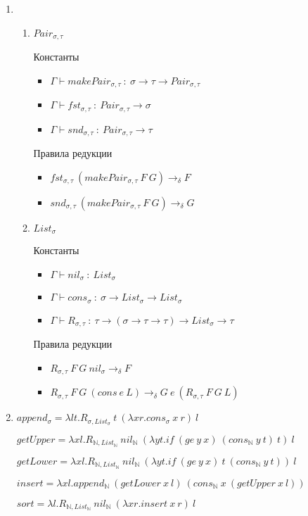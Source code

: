 \documentclass[10pt]{article}
\newcommand{\tod}{\to_\delta}
\renewcommand{\l}{\lambda}
\newcommand{\s}{\sigma}
\newcommand{\N}{\mathbb{N}}
\begin{document}
\begin{enumerate}
	\item 
	\begin{enumerate}
		\item $Pair_{\s, \tau}$
		
		Константы
		\begin{itemize}
			\item $\Gamma \vdash makePair_{\s,\tau}\ :\ \s \to \tau \to Pair_{\s, \tau}$
			\item $\Gamma \vdash fst_{\s, \tau}\ :\ Pair_{\s, \tau} \to \s$
			\item $\Gamma \vdash snd_{\s, \tau}\ :\ Pair_{\s, \tau} \to \tau$
		\end{itemize}
		
		Правила редукции
		\begin{itemize}
			\item $fst_{\s, \tau}\ (makePair_{\s, \tau}\ F\ G) \tod F$
			\item $snd_{\s, \tau}\ (makePair_{\s, \tau}\ F\ G) \tod G$
		\end{itemize}
		
		\item $List_{\s}$
		
		Константы
		\begin{itemize}
			\item $\Gamma \vdash nil_\s\ :\ List_\s$
			\item $\Gamma \vdash cons_\s\ :\ \s \to List_\s \to List_\s$
			\item $\Gamma \vdash R_{\s,\tau}\ :\ \tau \to (\s \to \tau \to \tau) \to List_\s \to \tau$
		\end{itemize}
		
		Правила редукции
		\begin{itemize}
			\item $R_{\s, \tau}\ F\ G\ nil_\s \tod F$
			\item $R_{\s, \tau}\ F\ G\ (cons\ e\ L) \tod G\ e\ (R_{\s, \tau}\ F\ G\ L)$
		\end{itemize}
	\end{enumerate}
	
	\item 
	
	$append_\s = \l lt. R_{\s,List_\s}\ t\ (\l xr. cons_\s\ x\ r)\ l$
	
	$getUpper = \l xl. R_{\N,List_\N}\ nil_\N\ (\l yt. if\ (ge\ y\ x)\ (cons_\N\ y\ t)\ t)\ l$ 
	
	$getLower = \l xl. R_{\N,List_\N}\ nil_\N\ (\l yt. if\ (ge\ y\ x)\ t\ (cons_\N\ y\ t))\ l$ 
	
	$insert = \l xl. append_\N\ (getLower\ x\ l)\ (cons_\N\ x\ (getUpper\ x\ l))$ 
	
	$sort = \l l. R_{\N,List_\N}\ nil_\N\ (\l xr. insert\ x\ r)\ l$
\end{enumerate}
\end{document}
